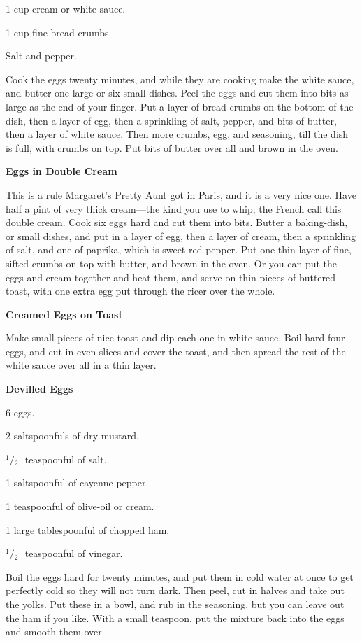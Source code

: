 \documentclass[11pt]{book}
\newcommand{\indpar}{\par\noindent\hspace*{\parindent}}
\newcommand{\ingredient}{\indpar}
\newcommand{\instruction}{\indpar}
\newcommand{\OneHalf}{\ensuremath{{}^1\!\!/\!{}_2\mbox{\ }}}
\newenvironment{RecipeTitle}{\medskip\begin{center}\large\bf }{\end{center}\smallskip}
\begin{document}
\ingredient  1 cup cream or white sauce.
\ingredient  1 cup fine bread-crumbs.
\ingredient  Salt and pepper.
\instruction
  Cook the eggs twenty minutes, and while they are
cooking make the white sauce, and butter one large or
six small dishes.  Peel the eggs and cut them into bits
as large as the end of your finger.  Put a layer of
bread-crumbs on the bottom of the dish, then a layer of
egg, then a sprinkling of salt, pepper, and bits of
butter, then a layer of white sauce.  Then more crumbs,
egg, and seasoning, till the dish is full, with crumbs
on top.  Put bits of butter over all and brown in the oven.
\begin{RecipeTitle}
Eggs in Double Cream\label{double_cream_with_eggs}
\end{RecipeTitle}
\instruction
  This is a rule Margaret's Pretty Aunt got in Paris,
and it is a very nice one.  Have half a pint of very
thick cream---the kind you use to whip; the French
call this double cream.  Cook six eggs hard and cut them
into bits.  Butter a baking-dish, or small dishes, and
put in a layer of egg, then a layer of cream, then a
sprinkling of salt, and one of paprika, which is sweet
red pepper.  Put one thin layer of fine, sifted crumbs
on top with butter, and brown in the oven.  Or you can
put the eggs and cream together and heat them, and
serve on thin pieces of buttered toast, with one extra
egg put through the ricer over the whole.
\begin{RecipeTitle}
Creamed Eggs on Toast\label{creamed_eggs_on_toast}
\end{RecipeTitle}
\instruction
  Make small pieces of nice toast and dip each one in
white sauce.  Boil hard four eggs, and cut in even
slices and cover the toast, and then spread the rest
of the white sauce over all in a thin layer.
\begin{RecipeTitle}
Devilled Eggs\label{devilled_eggs}
\end{RecipeTitle}
\ingredient  6 eggs.
\ingredient  2 saltspoonfuls of dry mustard.
\ingredient  \OneHalf teaspoonful of salt.
\ingredient  1 saltspoonful of cayenne pepper.
\ingredient  1 teaspoonful of olive-oil or cream.
\ingredient  1 large tablespoonful of chopped ham.
\ingredient  \OneHalf teaspoonful of vinegar.
\instruction
  Boil the eggs hard for twenty minutes, and put them in
cold water at once to get perfectly cold so they will not
turn dark.  Then peel, cut in halves and take out the yolks.
Put these in a bowl, and rub in the seasoning, but you
can leave out the ham if you like.  With a small teaspoon,
put the mixture back into the eggs and smooth them over
\end{document}
